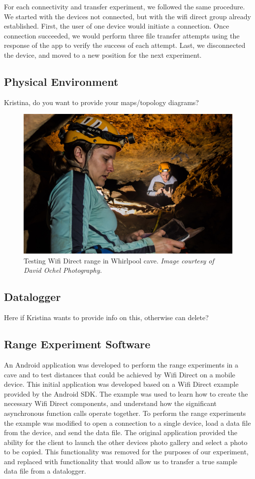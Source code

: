 \documentclass[10pt,twocolumn]{article}
\begin{document}
For each connectivity and transfer experiment, we followed the same procedure. 
We started with the devices not connected, but with the wifi direct group already established.
First, the user of one device would initiate a connection.
Once connection succeeded, we would perform three file transfer attempts using the response of the app to verify the success of each attempt.
Last, we disconnected the device, and moved to a new position for the next experiment.

\subsection{Physical Environment}
Kristina, do you want to provide your maps/topology diagrams?
\begin{figure}
\includegraphics[width=\columnwidth]{cavewifi}
\caption{Testing Wifi Direct range in Whirlpool cave. \textit{Image courtesy of David Ochel Photography.}}
\end{figure}
\subsection{Datalogger}
Here if Kristina wants to provide info on this, otherwise can delete?
\subsection{Range Experiment Software}
An Android application was developed to perform the range experiments in a cave and to test distances that could be achieved by Wifi Direct on a mobile device.
This initial application was developed based on a Wifi Direct example provided by the Android SDK.
The example was used to learn how to create the necessary Wifi Direct components, and understand how the significant asynchronous function calls operate together.
To perform the range experiments the example was modified to open a connection to a single device, load a data file from the device, and send the data file. 
The original application provided the ability for the client to launch the other devices photo gallery and select a photo to be copied.
This functionality was removed for the purposes of our experiment, and replaced with functionality that would allow us to transfer a true sample data file from a datalogger.
\end{document}
